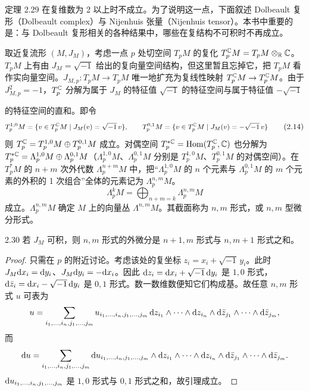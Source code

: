 定理 2.29 在复维数为 2 以上时不成立。为了说明这一点，下面叙述 Dolbeault 复形（Dolbeault complex）与 Nijenhuis 张量（Nijenhuis tensor）。本书中重要的是：与 Dolbeault 复形相关的各种结果中，哪些在复结构不可积时不再成立。

取近复流形 $(M,J_M)$，考虑一点 $p$ 处切空间 $T_pM$ 的复化 $T_p^{\mathbb{C}} M=T_pM\otimes_{\mathbb{R}}\mathbb{C}$。$T_pM$ 上有由 $J_M=\sqrt{-1}$ 给出的复向量空间结构，但这里暂且忘掉它，把 $T_pM$ 看作实向量空间。$J_{M,p}\colon T_pM\to T_pM$ 唯一地扩充为复线性映射 $T_p^{\mathbb{C}} M\to T_p^{\mathbb{C}} M$。由于 $J_{M,p}^2=-1$，$T_p^{\mathbb{C}}$ 分解为属于 $J_M$ 的特征值 $\sqrt{-1}$ 的特征空间与属于特征值 $-\sqrt{-1}$

的特征空间的直和。即令
\begin{equation}
  \resizebox{0.97\linewidth}{!}{$\displaystyle T_p^{1,0}M=\{v\in T_p^\C M\mid J_M(v)=\sqrt{-1}\,v\},\qquad T_p^{0,1}M=\{v\in T_p^\C M\mid J_M(v)=-\sqrt{-1}\,v\} $} \tag{2.14}
\end{equation}
则 $T_p^{\mathbb{C}}=T_p^{1,0}M\oplus T_p^{0,1}M$ 成立。对偶空间 $T_p^{*\mathbb{C}}=\operatorname{Hom}(T_p^{\mathbb{C}},\mathbb{C})$ 也分解为 $T_p^{*\mathbb{C}}=\Lambda_p^{1,0}M\oplus\Lambda_p^{0,1}M$（$\Lambda_p^{1,0}M$、$\Lambda_p^{0,1}M$ 分别是 $T_p^{1,0}M$、$T_p^{0,1}M$ 的对偶空间）。在 $T_p^*M$ 的 $n+m$ 次外代数 $\Lambda_p^{n+m}M$ 中，把“$\Lambda_p^{1,0}M$ 的 $n$ 个元素与 $\Lambda_p^{0,1}M$ 的 $m$ 个元素的外积的 1 次组合”全体的元素记为 $\Lambda_p^{n,m}M$。
\begin{equation}
  \Lambda_p^kM=\bigoplus_{n+m=k}\Lambda_p^{n,m}M \tag{2.15}
\end{equation}
成立。$\Lambda_p^{n,m}M$ 确定 $M$ 上的向量丛 $\Lambda^{n,m}M$。其截面称为 $n,m$ 形式，或 $n,m$ 型微分形式。

\begin{lemma*}{2.30}
  若 $J_M$ 可积，则 $n,m$ 形式的外微分是 $n+1,m$ 形式与 $n,m+1$ 形式之和。
\end{lemma*}

\begin{proof}
  只需在 $p$ 的附近讨论。考虑该处的复坐标 $z_i=x_i+\sqrt{-1}\,y_i$。此时 $J_M\mathrm{d} x_i=\mathrm{d} y_i$、$J_M\mathrm{d} y_i=-\mathrm{d} x_i$。因此 $\mathrm{d} z_i=\mathrm{d} x_i+\sqrt{-1}\,\mathrm{d} y_i$ 是 $1,0$ 形式，$\mathrm{d}\bar z_i=\mathrm{d} x_i-\sqrt{-1}\,\mathrm{d} y_i$ 是 $0,1$ 形式。数一数维数便知它们构成基。故任意 $n,m$ 形式 $u$ 可表为
  \[
    u=\sum_{i_1,\dots,i_n,j_1,\dots,j_m}u_{i_1,\dots,i_n,j_1,\dots,j_m}\,\mathrm{d} z_{i_1}\wedge\cdots\wedge\mathrm{d} z_{i_n}\wedge\mathrm{d}\bar z_{j_1}\wedge\cdots\wedge\mathrm{d}\bar z_{j_m},
  \]
  而
  \[
    \mathrm{d} u=\sum_{i_1,\dots,i_n,j_1,\dots,j_m}\mathrm{d} u_{i_1,\dots,i_n,j_1,\dots,j_m}\wedge\mathrm{d} z_{i_1}\wedge\cdots\wedge\mathrm{d} z_{i_n}\wedge\mathrm{d}\bar z_{j_1}\wedge\cdots\wedge\mathrm{d}\bar z_{j_m}.
  \]
  $\mathrm{d} u_{i_1,\dots,i_n,j_1,\dots,j_m}$ 是 $1,0$ 形式与 $0,1$ 形式之和，故引理成立。
\end{proof}

